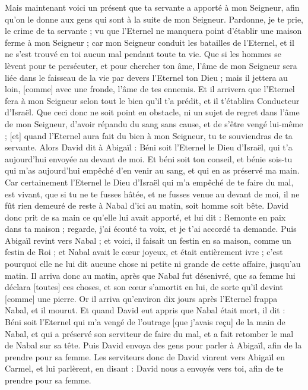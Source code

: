 \begin{multicols}{2}
Mais maintenant voici un présent que ta servante a apporté à mon Seigneur, afin qu'on le donne aux gens qui sont à la suite de mon Seigneur.
Pardonne, je te prie, le crime de ta servante ; vu que l'Eternel ne manquera point d'établir une maison ferme à mon Seigneur ; car mon Seigneur conduit les batailles de l'Eternel, et il ne s'est trouvé en toi aucun mal pendant toute ta vie.
Que si les hommes se lèvent pour te persécuter, et pour chercher ton âme, l'âme de mon Seigneur sera liée dans le faisseau de la vie par devers l'Eternel ton Dieu ; mais il jettera au loin, [comme] avec une fronde, l'âme de tes ennemis.
Et il arrivera que l'Eternel fera à mon Seigneur selon tout le bien qu'il t'a prédit, et il t'établira Conducteur d'Israël.
Que ceci donc ne soit point en obstacle, ni un sujet de regret dans l'âme de mon Seigneur, d'avoir répandu du sang sans cause, et de s'être vengé lui-même ; [et] quand l'Eternel aura fait du bien à mon Seigneur, tu te souviendras de ta servante.
Alors David dit à Abigaïl : Béni soit l'Eternel le Dieu d'Israël, qui t'a aujourd'hui envoyée au devant de moi.
Et béni soit ton conseil, et bénie sois-tu qui m'as aujourd'hui empêché d'en venir au sang, et qui en as préservé ma main.
Car certainement l'Eternel le Dieu d'Israël qui m'a empêché de te faire du mal, est vivant, que si tu ne te fusses hâtée, et ne fusses venue au devant de moi, il ne fût rien demeuré de reste à Nabal d'ici au matin, soit homme soit bête.
David donc prit de sa main ce qu'elle lui avait apporté, et lui dit : Remonte en paix dans ta maison ; regarde, j'ai écouté ta voix, et je t'ai accordé ta demande.
Puis Abigaïl revint vers Nabal ; et voici, il faisait un festin en sa maison, comme un festin de Roi ; et Nabal avait le cœur joyeux, et était entièrement ivre ; c'est pourquoi elle ne lui dit aucune chose ni petite ni grande de cette affaire, jusqu'au matin.
Il arriva donc au matin, après que Nabal fut désenivré, que sa femme lui déclara [toutes] ces choses, et son cœur s'amortit en lui, de sorte qu'il devint [comme] une pierre.
Or il arriva qu'environ dix jours après l'Eternel frappa Nabal, et il mourut.
Et quand David eut appris que Nabal était mort, il dit : Béni soit l'Eternel qui m'a vengé de l'outrage [que j'avais reçu] de la main de Nabal, et qui a préservé son serviteur de faire du mal, et a fait retomber le mal de Nabal sur sa tête. Puis David envoya des gens pour parler à Abigaïl, afin de la prendre pour sa femme.
Les serviteurs donc de David vinrent vers Abigaïl en Carmel, et lui parlèrent, en disant : David nous a envoyés vers toi, afin de te prendre pour sa femme.

\end{multicols}
